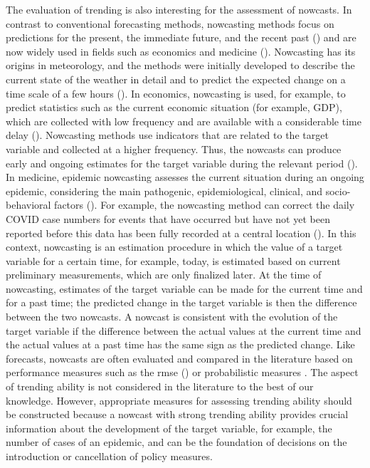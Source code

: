 The evaluation of trending is also interesting for the assessment of nowcasts.
In contrast to conventional forecasting methods, nowcasting methods focus on predictions for the present, the immediate future, and the recent past (\cite{banbura2013now}) and are now widely used in fields such as economics and medicine (\cite{bok2018macroeconomic, Wolffram2023}).
Nowcasting has its origins in meteorology, and the methods were initially developed to describe the current state of the weather in detail and to predict the expected change on a time scale of a few hours (\cite{browning1989nowcasting,schmid2019nowcasting}). In economics, nowcasting is used, for example, to predict statistics such as the current economic situation (for example, GDP), which are collected with low frequency and are available with a considerable time delay (\cite{banbura2013now}).
Nowcasting methods use indicators that are related to the target variable and collected at a higher frequency.
Thus, the nowcasts can produce early and ongoing estimates for the target variable during the relevant period (\cite{castle2017forecasting}). 
In medicine, epidemic nowcasting assesses the current situation during an ongoing epidemic, considering the main pathogenic, epidemiological, clinical, and socio-behavioral factors (\cite{wu2021nowcasting}). 
For example, the nowcasting method can correct the daily COVID case numbers for events that have occurred but have not yet been reported before this data has been fully recorded at a central location (\cite{gunther2021nowcasting}). 
In this context, nowcasting is an estimation procedure in which the value of a target variable for a certain time, for example, today, is estimated based on current preliminary measurements, which are only finalized later. 
At the time of nowcasting, estimates of the target variable can be made for the current time and for a past time; the predicted change in the target variable is then the difference between the two nowcasts. A nowcast is consistent with the evolution of the target variable if the difference between the actual values at the current time and the actual values at a past time has the same sign as the predicted change. Like forecasts, nowcasts are often evaluated and compared in the literature based on performance measures such as the \ac{rmse} (\cite{gunther2021nowcasting}) or probabilistic measures \parencite{Wolffram2023}. The aspect of trending ability is not considered in the literature to the best of our knowledge. However, appropriate measures for assessing trending ability should be constructed because a nowcast with strong trending ability provides crucial information about the development of the target variable, for example, the number of cases of an epidemic, and can be the foundation of decisions on the introduction or cancellation of policy measures.


